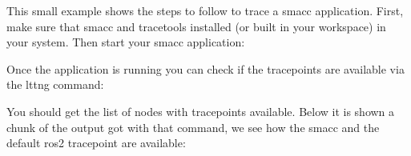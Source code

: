 This small example shows the steps to follow to trace a smacc application. First, make sure that smacc and tracetools installed (or built in your workspace) in your system. Then start your smacc application\+:


\begin{DoxyCode}{0}

\end{DoxyCode}


Once the application is running you can check if the tracepoints are available via the lttng command\+:


\begin{DoxyCode}{0}

\end{DoxyCode}


You should get the list of nodes with tracepoints available. Below it is shown a chunk of the output got with that command, we see how the smacc and the default ros2 tracepoint are available\+:



